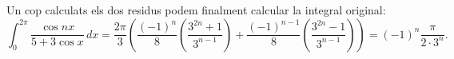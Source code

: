 \documentclass[12pt]{article}
\numberwithin{table}{section}
\numberwithin{figure}{section}
\numberwithin{equation}{section}
\begin{document}
Un cop calculats els dos residus podem finalment calcular la integral original:
\begin{equation*}
	\int_0^{2\pi} \frac{\cos{nx}}{5 + 3\cos{x}} \, dx = \frac{2\pi}{3} \left( \frac{(-1)^n}{8} \left(\frac{3^{2n} + 1}{3^{n-1}}\right) + \frac{(-1)^{n-1}}{8}\left(\frac{3^{2n} - 1}{3^{n-1}}\right)\right) = (-1)^n\frac{\pi}{2\cdot3^n}.
\end{equation*}
\end{document}
